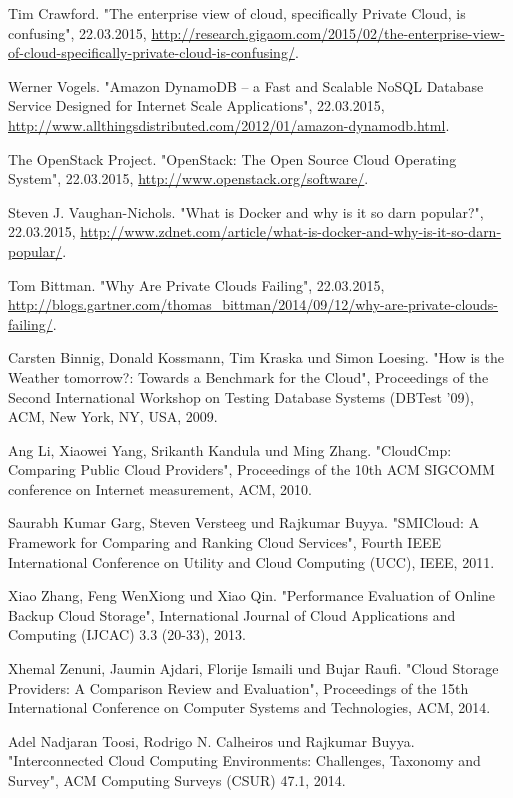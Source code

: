 \begin{thebibliography}{1}
Tim Crawford. "The enterprise view of cloud, specifically Private Cloud, is confusing", 22.03.2015, \url{http://research.gigaom.com/2015/02/the-enterprise-view-of-cloud-specifically-private-cloud-is-confusing/}.

Werner Vogels. "Amazon DynamoDB – a Fast and Scalable NoSQL Database Service Designed for Internet Scale Applications", 22.03.2015, \url{http://www.allthingsdistributed.com/2012/01/amazon-dynamodb.html}.

The OpenStack Project. "OpenStack: The Open Source Cloud Operating System", 22.03.2015, \url{http://www.openstack.org/software/}.

Steven J. Vaughan-Nichols. "What is Docker and why is it so darn popular?", 22.03.2015, \url{http://www.zdnet.com/article/what-is-docker-and-why-is-it-so-darn-popular/}.

Tom Bittman. "Why Are Private Clouds Failing", 22.03.2015, \url{http://blogs.gartner.com/thomas_bittman/2014/09/12/why-are-private-clouds-failing/}.

Carsten Binnig, Donald Kossmann, Tim Kraska und Simon Loesing. "How is the Weather tomorrow?: Towards a Benchmark for the Cloud", Proceedings of the Second International Workshop on Testing Database Systems (DBTest '09), ACM, New York, NY, USA, 2009.

Ang Li, Xiaowei Yang, Srikanth Kandula und Ming Zhang. "CloudCmp: Comparing Public Cloud Providers", Proceedings of the 10th ACM SIGCOMM conference on Internet measurement, ACM, 2010.

Saurabh Kumar Garg, Steven Versteeg und Rajkumar Buyya. "SMICloud: A Framework for Comparing and Ranking Cloud Services", Fourth IEEE International Conference on Utility and Cloud Computing (UCC), IEEE, 2011.

Xiao Zhang, Feng WenXiong und Xiao Qin. "Performance Evaluation of Online Backup Cloud Storage", International Journal of Cloud Applications and Computing (IJCAC) 3.3 (20-33), 2013.

Xhemal Zenuni, Jaumin Ajdari, Florije Ismaili und Bujar Raufi. "Cloud Storage Providers: A Comparison Review and Evaluation", Proceedings of the 15th International Conference on Computer Systems and Technologies, ACM, 2014.

Adel Nadjaran Toosi, Rodrigo N. Calheiros und Rajkumar Buyya. "Interconnected Cloud Computing Environments: Challenges, Taxonomy and Survey", ACM Computing Surveys (CSUR) 47.1, 2014.

\end{thebibliography}
